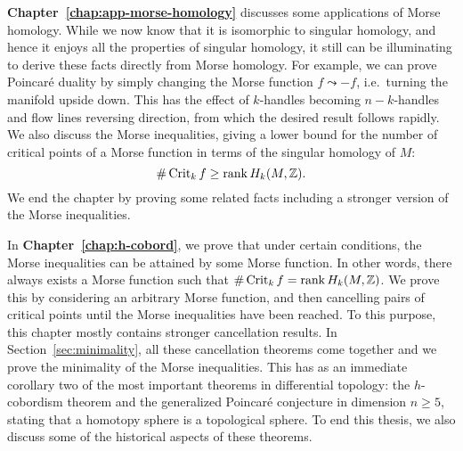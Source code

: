 \bigskip
\textbf{Chapter~\ref{chap:app-morse-homology}} discusses some applications of Morse homology.
While we now know that it is isomorphic to singular homology, and hence it enjoys all the properties of singular homology, it still can be illuminating to derive these facts directly from Morse homology.
For example, we can prove Poincaré duality by simply changing the Morse function $f \leadsto -f$, i.e.\ turning the manifold upside down.  This has the effect of $k$-handles becoming $n-k$-handles and flow lines reversing direction, from which the desired result follows rapidly.
We also discuss the Morse inequalities, giving a lower bound for the number of critical points of a Morse function in terms of the singular homology of $M$:
 \[
     \# \operatorname{Crit}_k f \ge \operatorname{rank} H_k(M, \mathbb{Z})
.\] 
We end the chapter by proving some related facts including a stronger version of the Morse inequalities.

\bigskip
In \textbf{Chapter~\ref{chap:h-cobord}}, we prove that under certain conditions, the Morse inequalities can be attained by some Morse function.
In other words, there always exists a Morse function such that $\# \operatorname{Crit}_k f = \operatorname{rank} H_k(M, \mathbb{Z})$.
We prove this by considering an arbitrary Morse function,
and then cancelling pairs of critical points until the Morse inequalities have been reached.
To this purpose, this chapter mostly contains stronger cancellation results.
In Section~\ref{sec:minimality}, all these cancellation theorems come together and we prove the minimality of the Morse inequalities.
This has as an immediate corollary two of the most important theorems in differential topology: the $h$-cobordism theorem and the generalized Poincaré conjecture in dimension $n \ge 5$, stating that a homotopy sphere is a topological sphere.
To end this thesis, we also discuss some of the historical aspects of these theorems.
